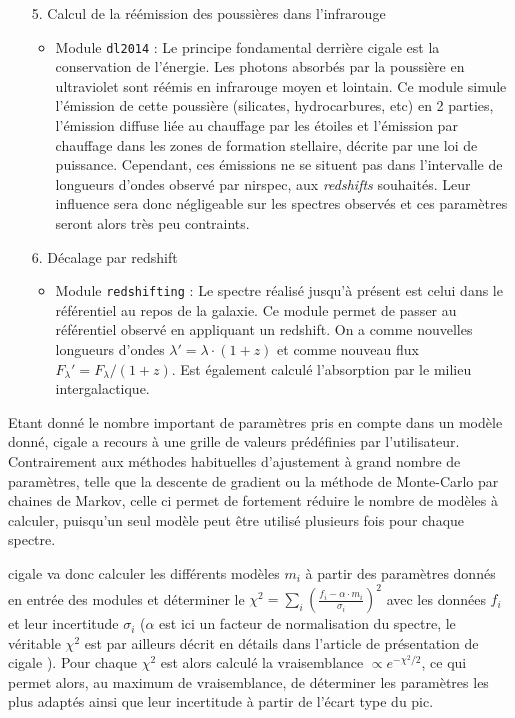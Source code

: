 \documentclass[12pt, a4paper]{article}
\begin{document}
\begin{itemize}
  \item[5.] Calcul de la réémission des poussières dans l'infrarouge
  \begin{itemize}
    \item Module \texttt{dl2014} : Le principe fondamental derrière \gls{cigale} est la conservation de l'énergie. Les photons absorbés par la poussière en ultraviolet sont réémis en infrarouge moyen et lointain. Ce module simule l'émission de cette poussière (silicates, hydrocarbures, etc) en 2 parties, l'émission diffuse liée au chauffage par les étoiles et l'émission par chauffage dans les zones de formation stellaire, décrite par une loi de puissance. Cependant, ces émissions ne se situent pas dans l'intervalle de longueurs d'ondes observé par \gls{nirspec}, aux \textit{redshifts} souhaités. Leur influence sera donc négligeable sur les spectres observés et ces paramètres seront alors très peu contraints.
    
  \end{itemize}
  \item[6.] Décalage par redshift
  \begin{itemize}
    \item Module \texttt{redshifting} : Le spectre réalisé jusqu'à présent est celui dans le référentiel au repos de la galaxie. Ce module permet de passer au référentiel observé en appliquant un redshift. On a comme nouvelles longueurs d'ondes $\lambda' = \lambda \cdot (1+z)$ et comme nouveau flux $F_\lambda' = F_\lambda / (1+z)$. Est également calculé l'absorption par le milieu intergalactique.
  
  \end{itemize}
\end{itemize}

Etant donné le nombre important de paramètres pris en compte dans un modèle donné, \gls{cigale} a recours à une grille de valeurs prédéfinies par l'utilisateur. Contrairement aux méthodes habituelles d'ajustement à grand nombre de paramètres, telle que la descente de gradient ou la méthode de Monte-Carlo par chaines de Markov, celle ci permet de fortement réduire le nombre de modèles à calculer, puisqu'un seul modèle peut être utilisé plusieurs fois pour chaque spectre.

\gls{cigale} va donc calculer les différents modèles $m_i$ à partir des paramètres donnés en entrée des modules et déterminer le $\chi^2 = \sum_{i} (\frac{f_i - \alpha \cdot m_i}{\sigma_i})^2$ avec les données $f_i$ et leur incertitude $\sigma_i$ ($\alpha$ est ici un facteur de normalisation du spectre, le véritable $\chi^2$ est par ailleurs décrit en détails dans l'article de présentation de \gls{cigale} \parencite{cigale}). Pour chaque $\chi^2$ est alors calculé la vraisemblance $\propto e^{-\chi^2 / 2}$, ce qui permet alors, au maximum de vraisemblance, de déterminer les paramètres les plus adaptés ainsi que leur incertitude à partir de l'écart type du pic.\\
\end{document}
